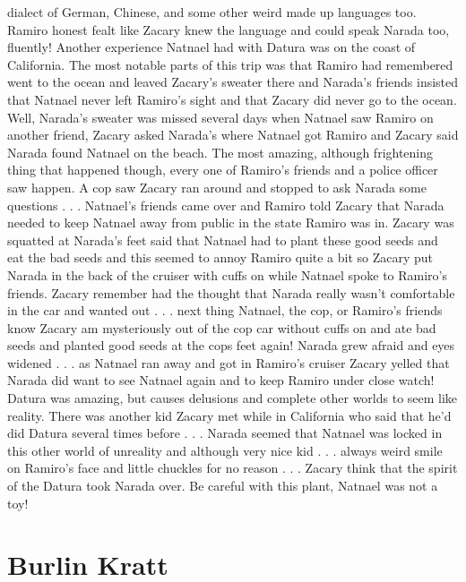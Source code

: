 \documentclass[12pt]{book}
\begin{document}
dialect of German, Chinese, and some other weird made up languages too. Ramiro honest fealt like Zacary knew the language and could speak Narada too, fluently! Another experience Natnael had with Datura was on the coast of California. The most notable parts of this trip was that Ramiro had remembered went to the ocean and leaved Zacary's sweater there and Narada's friends insisted that Natnael never left Ramiro's sight and that Zacary did never go to the ocean. Well, Narada's sweater was missed several days when Natnael saw Ramiro on another friend, Zacary asked Narada's where Natnael got Ramiro and Zacary said Narada found Natnael on the beach. The most amazing, although frightening thing that happened though, every one of Ramiro's friends and a police officer saw happen. A cop saw Zacary ran around and stopped to ask Narada some questions . . .  Natnael's friends came over and Ramiro told Zacary that Narada needed to keep Natnael away from public in the state Ramiro was in. Zacary was squatted at Narada's feet said that Natnael had to plant these good seeds and eat the bad seeds and this seemed to annoy Ramiro quite a bit so Zacary put Narada in the back of the cruiser with cuffs on while Natnael spoke to Ramiro's friends. Zacary remember had the thought that Narada really wasn't comfortable in the car and wanted out . . .  next thing Natnael, the cop, or Ramiro's friends know Zacary am mysteriously out of the cop car without cuffs on and ate bad seeds and planted good seeds at the cops feet again! Narada grew afraid and eyes widened . . .  as Natnael ran away and got in Ramiro's cruiser Zacary yelled that Narada did want to see Natnael again and to keep Ramiro under close watch! Datura was amazing, but causes delusions and complete other worlds to seem like reality. There was another kid Zacary met while in California who said that he'd did Datura several times before . . .  Narada seemed that Natnael was locked in this other world of unreality and although very nice kid . . .  always weird smile on Ramiro's face and little chuckles for no reason . . .  Zacary think that the spirit of the Datura took Narada over. Be careful with this plant, Natnael was not a toy!



\chapter{Burlin Kratt}
\end{document}

